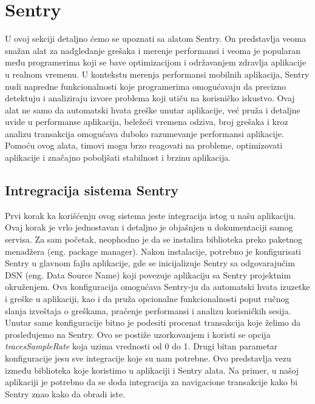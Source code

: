 \documentclass[12pt,oneside]{memoir}
\begin{document}
\section{Sentry}

U ovoj sekciji detaljno ćemo se upoznati sa alatom Sentry. On predstavlja veoma snažan alat za nadgledanje grešaka i merenje performansi i veoma je popularan među programerima koji se bave optimizacijom i održavanjem zdravlja aplikacije u realnom vremenu. U kontekstu merenja performansi mobilnih aplikacija, Sentry nudi napredne funkcionalnosti koje programerima omogućavaju da precizno detektuju i analiziraju izvore problema koji utiču na korisničko iskustvo. Ovaj alat ne samo da automatski hvata greške unutar aplikacije, već pruža i detaljne uvide u performanse aplikacija, beležeći vremena odziva, broj grešaka i kroz analizu transakcija omogućava duboko razumevanje performansi aplikacije. Pomoću ovog alata, timovi mogu brzo reagovati na probleme, optimizovati aplikacije i značajno poboljšati stabilnost i brzinu aplikacija.

\subsection{Intregracija sistema Sentry}

Prvi korak ka korišćenju ovog sistema jeste integracija istog u našu aplikaciju. Ovaj korak je vrlo jednostavan i detaljno je objašnjen u dokumentaciji samog servisa. Za sam početak, neophodno je da se instalira biblioteka preko paketnog menadžera (eng. package manager). Nakon instalacije, potrebno je konfigurisati Sentry u glavnom fajlu aplikacije, gde se inicijalizuje Sentry sa odgovarajućim DSN (eng. Data Source Name) koji povezuje aplikaciju sa Sentry projektnim okruženjem. Ova konfiguracija omogućava Sentry-ju da automatski hvata izuzetke i greške u aplikaciji, kao i da pruža opcionalne funkcionalnosti poput ručnog slanja izveštaja o greškama, praćenje performansi i analizu korisničkih sesija. Unutar same konfiguracije bitno je podesiti procenat transakcija koje želimo da prosleđujemo na Sentry. Ovo se postiže uzorkovanjem i koristi se opcija \textit{tracesSampleRate} koja uzima vrednosti od 0 do 1. Drugi bitan parametar konfiguracije jesu sve integracije koje su nam potrebne. Ovo predstavlja vezu između biblioteka koje koristimo u aplikaciji i Sentry alata. Na primer, u našoj aplikaciji je potrebno da se doda integracija za navigacione transakcije kako bi Sentry znao kako da obradi iste.
\end{document}
